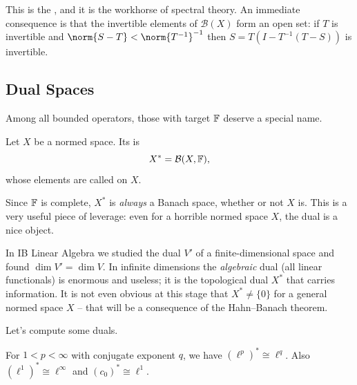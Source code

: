 \documentclass[a4paper]{scrartcl}
\newcommand{\Bop}{\mathcal{B}}
\begin{document}
This is the , and it is the workhorse of spectral theory. An immediate consequence is that the invertible elements of $\Bop(X)$ form an open set: if $T$ is invertible and $\norm{S - T} < \norm{T^{-1}}^{-1}$ then $S = T(I - T^{-1}(T-S))$ is invertible.

\subsection{Dual Spaces}

Among all bounded operators, those with target $\mathbb{F}$ deserve a special name.

\begin{definition}
	Let $X$ be a normed space. Its  is
	$$X^* = \Bop(X, \F),$$
	whose elements are called  on $X$.
\end{definition}

Since $\mathbb{F}$ is complete, $X^*$ is \emph{always} a Banach space, whether or not $X$ is. This is a very useful piece of leverage: even for a horrible normed space $X$, the dual is a nice object.

In IB Linear Algebra we studied the dual $V'$ of a finite-dimensional space and found $\dim V' = \dim V$. In infinite dimensions the \emph{algebraic} dual (all linear functionals) is enormous and useless; it is the topological dual $X^*$ that carries information. It is not even obvious at this stage that $X^* \neq \{0\}$ for a general normed space $X$ -- that will be a consequence of the Hahn--Banach theorem.

Let's compute some duals.

\begin{proposition}
	For $1 < p < \infty$ with conjugate exponent $q$, we have $(\ell^p)^* \cong \ell^q$. Also $(\ell^1)^* \cong \ell^\infty$ and $(c_0)^* \cong \ell^1$.
\end{proposition}
\end{document}
